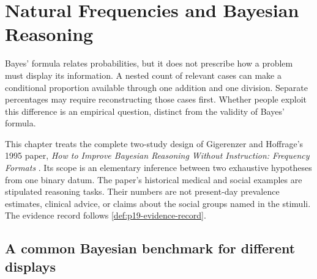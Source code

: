 \chapter{Natural Frequencies and Bayesian Reasoning}
\label{sec:p19-natural-frequencies-bayesian-reasoning}

Bayes' formula relates probabilities, but it does not prescribe how a problem
must display its information. A nested count of relevant cases can make a
conditional proportion available through one addition and one division.
Separate percentages may require reconstructing those cases first. Whether
people exploit this difference is an empirical question, distinct from the
validity of Bayes' formula.

This chapter treats the complete two-study design of Gigerenzer and Hoffrage's
1995 paper, \emph{How to Improve Bayesian Reasoning Without Instruction:
Frequency Formats} \cite{GigerenzerHoffrage1995FrequencyFormats}. Its scope is
an elementary inference between two exhaustive hypotheses from one binary
datum. The paper's historical medical and social examples are stipulated
reasoning tasks. Their numbers are not present-day prevalence estimates,
clinical advice, or claims about the social groups named in the stimuli.
The evidence record follows \cref{def:p19-evidence-record}.

\section{A common Bayesian benchmark for different displays}
\label{sec:p19-frequency-benchmark}

